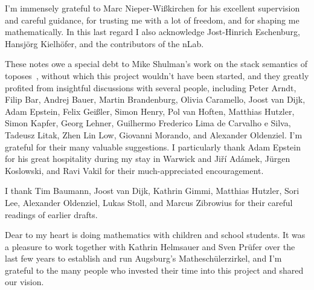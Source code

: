 \documentclass[10pt,reqno,a4paper]{amsbook}
\theoremstyle{definition}
\theoremstyle{plain}
\theoremstyle{remark}
\newcommand{\?}{\,{:}\,}
\renewcommand{\_}{\mathpunct{.}\,}
\begin{document}
{I'm immensely grateful to Marc Nieper-Wißkirchen for his excellent supervision and
careful guidance, for trusting me with a lot of freedom, and for shaping me
mathematically. In this last regard I also acknowledge Jost-Hinrich Eschenburg,
Hansjörg Kielhöfer, and the contributors of the nLab.

These notes owe a special debt to Mike Shulman's work on the stack semantics of
toposes~\cite{shulman:stack}, without which this project wouldn't have been
started, and they greatly profited from insightful discussions with several people,
including Peter Arndt, Filip Bar, Andrej Bauer, Martin Brandenburg, Olivia
Caramello, Joost van Dijk, Adam Epstein, Felix Geißler, Simon Henry, Pol van Hoften, Matthias Hutzler, Simon
Kapfer, Georg Lehner, Guilhermo Frederico Lima de Carvalho e Silva, Tadeusz Litak, Zhen Lin
Low, Giovanni Morando, and Alexander Oldenziel. I'm grateful for their many valuable suggestions. I
particularly thank Adam Epstein for his great hospitality during my stay in
Warwick and Jiří Adámek, Jürgen Koslowski, and Ravi Vakil for their
much-appreciated encouragement.

I thank Tim Baumann, Joost van Dijk, Kathrin Gimmi, Matthias Hutzler, Sori Lee, Alexander Oldenziel, Lukas Stoll, and Marcus Zibrowius for their
careful readings of earlier drafts.

Dear to my heart is doing mathematics with children and school students. It was
a pleasure to work together with Kathrin Helmsauer and Sven Prüfer over the
last few years to establish and run Augsburg's Matheschülerzirkel, and I'm
grateful to the many people who invested their time into this project and shared our
vision.

}
\end{document}
